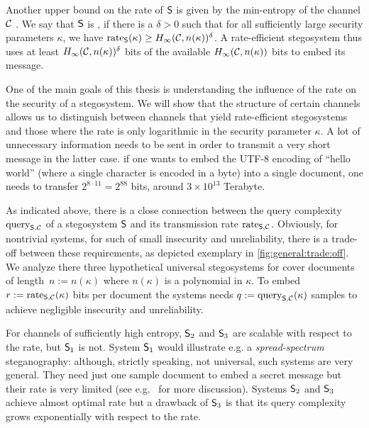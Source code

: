 \begin{description}
  Another upper bound on the rate of $\operatorname{\mathsf{S}}$ is given by the min-entropy
  of the channel
  $\mathcal{C}$ \cite{hopper2009provably}. We say that $\operatorname{\mathsf{S}}$ is
  , if there is a $\delta > 0$ such that for all
  sufficiently large security parameters $\kappa$, we have
  $\operatorname{rate}_{\operatorname{\mathsf{S}}}(\kappa) \geq H_{\infty}(\mathcal{C},n(\kappa))^{\delta}$.  A
  rate-efficient stegosystem thus uses at least
  $H_{\infty}(\mathcal{C},n(\kappa))^{\delta}$ bits of the available
  $H_{\infty}(\mathcal{C},n(\kappa))$ bits to embed its message. 

  One of the main goals of this thesis is understanding the
  influence of the rate on the security of a stegosystem. We will show
  that the structure of certain channels allows us to distinguish
  between channels that yield rate-efficient stegosystems and those
  where the rate is only logarithmic in the security parameter
  $\kappa$. A lot of unnecessary information needs to be sent in
  order to transmit a very short message in the latter case. \Eg if one wants to embed the
  \acs{UTF-8} encoding of \enquote{hello world} (where a single
  character is encoded in a byte) into a single document, one needs to
  transfer $2^{8\cdot 11}=2^{88}$ bits, around $3\times 10^{13}$ Terabyte.

\end{description}

As indicated above, there is a close connection between the query
complexity $\operatorname{query}_{\operatorname{\mathsf{S}},\mathcal{C}}$ of a stegosystem $\operatorname{\mathsf{S}}$ and its
transmission rate $\operatorname{rate}_{\operatorname{\mathsf{S}},\mathcal{C}}$. Obviously, for nontrivial
systems, \ie for such of small insecurity and unreliability, there is a
trade-off between these requirements, as depicted exemplary in
\autoref{fig:general:trade:off}.
We analyze there three hypothetical universal stegosystems
for cover documents of length~$n := n(\kappa)$ where $n(\kappa)$ is a
polynomial in $\kappa$.
To embed $r := \operatorname{rate}_{\operatorname{\mathsf{S}},\mathcal{C}}(\kappa)$ bits per document the
systems needs $q := \operatorname{query}_{\operatorname{\mathsf{S}},\mathcal{C}}(\kappa)$ 
samples to achieve negligible insecurity and unreliability. 

For channels of sufficiently high entropy, 
$\operatorname{\mathsf{S}}_2$ and $\operatorname{\mathsf{S}}_3$ are scalable with respect to the rate, but $\operatorname{\mathsf{S}}_1$ is not.
System $\operatorname{\mathsf{S}}_1$ would illustrate e.g. a \emph{spread-spectrum} steganography: 
although, strictly speaking, not universal, such systems are very general. 
They need just one sample document to embed a secret message but their rate is very limited 
(see e.g.~\cite{fridrich2009steganography} for more discussion).
Systems $\operatorname{\mathsf{S}}_2$ and $\operatorname{\mathsf{S}}_3$ achieve almost optimal rate but a drawback of $\operatorname{\mathsf{S}}_3$
is that its query complexity grows exponentially with respect to the rate.

